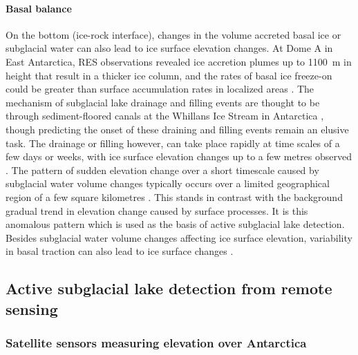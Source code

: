 \paragraph{Basal balance}

On the bottom (ice-rock interface), changes in the volume accreted basal ice or subglacial water can also lead to ice surface elevation changes.
At Dome A in East Antarctica, \gls{RES} observations revealed ice accretion plumes up to \SI{1100}{\metre} in height that result in a thicker ice column, and the rates of basal ice freeze-on could be greater than surface accumulation rates in localized areas \citep{BellWidespreadPersistentThickening2011}.
The mechanism of subglacial lake drainage and filling events are thought to be through sediment-floored canals at the Whillans Ice Stream in Antarctica \citep{CarterAntarcticsubglaciallakes2017}, though predicting the onset of these draining and filling events remain an elusive task.
The drainage or filling however, can take place rapidly at time scales of a few days or weeks, with ice surface elevation changes up to a few metres observed \citep[e.g.][]{SiegfriedEpisodicicevelocity2016}.
The pattern of sudden elevation change over a short timescale caused by subglacial water volume changes typically occurs over a limited geographical region of a few square kilometres \citep[e.g.][]{Smithinventoryactivesubglacial2009,SiegfriedThirteenyearssubglacial2018}.
This stands in contrast with the background gradual trend in elevation change caused by surface processes.
It is this anomalous pattern which is used as the basis of active subglacial lake detection.
Besides subglacial water volume changes affecting ice surface elevation, variability in basal traction can also lead to ice surface changes \citep{GudmundssonTransmissionbasalvariability2003,Raymondrelationshipsurfacebasal2005,SergienkoCausessuddenshortterm2007}.



\clearpage
\subsection{Active subglacial lake detection from remote sensing} \label{sec:activesubglaciallakes}

\subsubsection{Satellite sensors measuring elevation over Antarctica}

